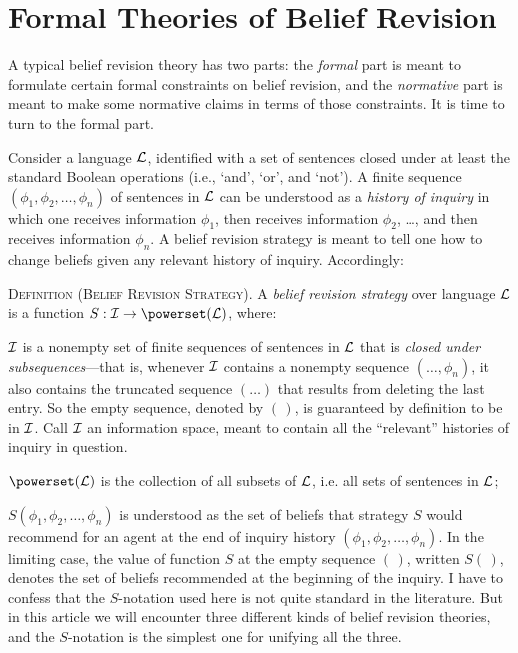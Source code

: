 \section{Formal Theories of Belief Revision}\label{sec-setting}

A typical belief revision theory has two parts: the {\em formal} part is meant to formulate certain formal constraints on belief revision, and the {\em normative} part is meant to make some normative claims in terms of those constraints. It is time to turn to the formal part. 

Consider a language ${\cal L}$, identified with a set of sentences closed under at least the standard Boolean operations (i.e., `and', `or', and `not'). A finite sequence $(\phi_1, \phi_2, \ldots, \phi_n)$ of sentences in ${\cal L}$ can be understood as a {\em history of inquiry} in which one receives information $\phi_1$, then receives information $\phi_2$, \ldots, and then receives information $\phi_n$. A belief revision strategy is meant to tell one how to change beliefs given any relevant history of inquiry. Accordingly: \op

	\xm \textsc{Definition (Belief Revision Strategy).} A {\em belief revision strategy} over language ${\cal L}$ is a function $S: {\cal I} \to \powerset({\cal L)}$, where: \op

	\im ${\cal I}$ is a nonempty set of finite sequences of sentences in ${\cal L}$ that is {\em closed under subsequences}---that is, whenever ${\cal I}$ contains a nonempty sequence $(\ldots, \phi_n)$, it also contains the truncated sequence $(\ldots)$ that results from deleting the last entry. So the empty sequence, denoted by $(\,)$, is guaranteed by definition to be in ${\cal I}$. Call ${\cal I}$ an information space, meant to contain all the ``relevant'' histories of inquiry in question.

	\im $\powerset({\cal L)}$ is the collection of all subsets of ${\cal L}$, i.e. all sets of sentences in ${\cal L}$;

	\im $S(\phi_1, \phi_2, \ldots, \phi_n)$ is understood as the set of beliefs that strategy $S$ would recommend for an agent at the end of inquiry history $(\phi_1, \phi_2, \ldots, \phi_n)$. In the limiting case, the value of function $S$ at the empty sequence $(\,)$, written $S(\,)$, denotes the set of beliefs recommended at the beginning of the inquiry.
	\ed
\ed
I have to confess that the $S$-notation used here is not quite standard in the literature. But in this article we will encounter three different kinds of belief revision theories, and the $S$-notation is the simplest one for unifying all the three.

